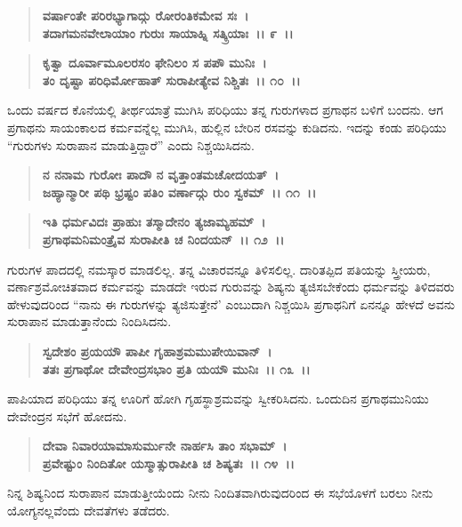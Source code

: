 \begin{verse}
\textbf{ವರ್ಷಾಂತೇ ಪರಿರಭ್ಯಾಗಾದ್ಗು ರೋರಂತಿಕಮೇವ ಸಃ~।}\\\textbf{ತದಾಗಮನವೇಲಾಯಾಂ ಗುರುಃ ಸಾಯಾಹ್ನಿ ಸತ್ಕ್ರಿಯಾಃ~।। ೯~।। }
\end{verse}

\begin{verse}
\textbf{ಕೃತ್ವಾ ದೂರ್ವಾಮೂಲರಸಂ ಫೇನಿಲಂ ಸ ಪಪೌ ಮುನಿಃ~।}\\\textbf{ತಂ ದೃಷ್ಟಾ ಪರಿಧಿರ್ಮೋಹಾತ್ ಸುರಾಪೀತ್ಯೇವ ನಿಶ್ಚಿತಃ~।। ೧೦~।।}
\end{verse}

ಒಂದು ವರ್ಷದ ಕೊನೆಯಲ್ಲಿ ತೀರ್ಥಯಾತ್ರೆ ಮುಗಿಸಿ ಪರಿಧಿಯು ತನ್ನ ಗುರುಗಳಾದ ಪ್ರಗಾಥನ ಬಳಿಗೆ ಬಂದನು. ಆಗ ಪ್ರಗಾಥನು ಸಾಯಂಕಾಲದ ಕರ್ಮವನ್ನೆಲ್ಲ ಮುಗಿಸಿ, ಹುಲ್ಲಿನ ಬೇರಿನ ರಸವನ್ನು ಕುಡಿದನು. ಇದನ್ನು ಕಂಡು ಪರಿಧಿಯು “ಗುರುಗಳು ಸುರಾಪಾನ ಮಾಡುತ್ತಿದ್ದಾರೆ” ಎಂದು ನಿಶ್ಚಯಿಸಿದನು.

\begin{verse}
\textbf{ನ ನನಾಮ ಗುರೋಃ ಪಾದೌ ನ ವೃತ್ತಾಂತಮಚೋದಯತ್~।}\\\textbf{ಜಹ್ಯಾನ್ಮಾರೀ ಪಥಿ ಭ್ರಷ್ಟಂ ಪತಿಂ ವರ್ಣಾದ್ಗು ರುಂ ಸ್ವಕಮ್~।। ೧೧~।। }
\end{verse}

\begin{verse}
\textbf{ಇತಿ ಧರ್ಮವಿದಃ ಪ್ರಾಹುಃ ತಸ್ಮಾದೇನಂ ತ್ಯಜಾಮ್ಯಹಮ್~।}\\\textbf{ಪ್ರಗಾಥಮನಿಮಂತ್ರೈವ ಸುರಾಪೀತಿ ಚ ನಿಂದಯನ್~।। ೧೨~।।}
\end{verse}

ಗುರುಗಳ ಪಾದದಲ್ಲಿ ನಮಸ್ಕಾರ ಮಾಡಲಿಲ್ಲ. ತನ್ನ ವಿಚಾರವನ್ನೂ ತಿಳಿಸಲಿಲ್ಲ. ದಾರಿತಪ್ಪಿದ ಪತಿಯನ್ನು ಸ್ತ್ರೀಯರು, ವರ್ಣಾಶ್ರಮೋಚಿತವಾದ ಕರ್ಮವನ್ನು ಮಾಡದೇ ಇರುವ ಗುರುವನ್ನು ಶಿಷ್ಯನು ತ್ಯಜಿಸಬೇಕೆಂದು ಧರ್ಮವನ್ನು ತಿಳಿದವರು ಹೇಳುವುದರಿಂದ “ನಾನು ಈ ಗುರುಗಳನ್ನು ತ್ಯಜಿಸುತ್ತೇನೆ' ಎಂಬುದಾಗಿ ನಿಶ್ಚಯಿಸಿ ಪ್ರಗಾಥನಿಗೆ ಏನನ್ನೂ ಹೇಳದೆ ಅವನು ಸುರಾಪಾನ ಮಾಡುತ್ತಾನೆಂದು ನಿಂದಿಸಿದನು.

\begin{verse}
\textbf{ಸ್ವದೇಶಂ ಪ್ರಯಯೌ ಪಾಪೀ ಗೃಹಾಶ್ರಮಮುಪೇಯಿವಾನ್~।}\\\textbf{ತತಃ ಪ್ರಗಾಥೋ ದೇವೇಂದ್ರಸಭಾಂ ಪ್ರತಿ ಯಯೌ ಮುನಿಃ~।। ೧೩~।।}
\end{verse}

ಪಾಪಿಯಾದ ಪರಿಧಿಯು ತನ್ನ ಊರಿಗೆ ಹೋಗಿ ಗೃಹಸ್ಥಾಶ್ರಮವನ್ನು ಸ್ವೀಕರಿಸಿದನು. ಒಂದುದಿನ ಪ್ರಗಾಥಮುನಿಯು ದೇವೇಂದ್ರನ ಸಭೆಗೆ ಹೋದನು.

\begin{verse}
\textbf{ದೇವಾ ನಿವಾರಯಾಮಾಸುರ್ಮುನೇ ನಾರ್ಹಸಿ ತಾಂ ಸಭಾಮ್~।}\\\textbf{ಪ್ರವೇಷ್ಟುಂ ನಿಂದಿತೋ ಯಸ್ಮಾತ್ಸುರಾಪೀತಿ ಚ ಶಿಷ್ಯತಃ~।। ೧೪~।।}
\end{verse}

ನಿನ್ನ ಶಿಷ್ಯನಿಂದ ಸುರಾಪಾನ ಮಾಡುತ್ತೀಯೆಂದು ನೀನು ನಿಂದಿತವಾಗಿರುವುದರಿಂದ ಈ ಸಭೆಯೊಳಗೆ ಬರಲು ನೀನು ಯೋಗ್ಯನಲ್ಲವೆಂದು ದೇವತೆಗಳು ತಡೆದರು.

